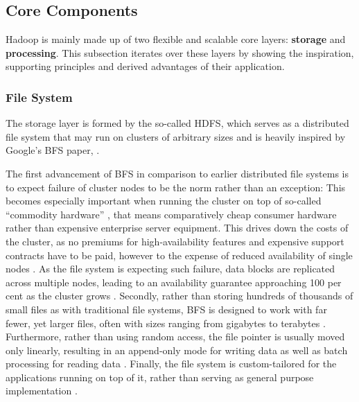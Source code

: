 \subsection{Core Components}
\label{hadoop-components}
\label{sota-hadoop-components}

Hadoop is mainly made up of two flexible and scalable core layers: \textbf{storage} and \textbf{processing}. This subsection iterates over these layers by showing the inspiration, supporting principles and derived advantages of their application.

\subsubsection{File System}
The storage layer is formed by the so-called \acf{HDFS}, which serves as a distributed file system that may run on clusters of arbitrary sizes and is heavily inspired by Google's \ac{BFS} paper, \textcite{ghemawat2003gfs}.

The first advancement of \ac{BFS} in comparison to earlier distributed file systems is to expect failure of cluster nodes to be the norm rather than an exception: This becomes especially important when running the cluster on top of so-called \enquote{commodity hardware} \autocite[p.~1]{ghemawat2003gfs}, that means comparatively cheap consumer hardware rather than expensive enterprise server equipment. This drives down the costs of the cluster, as no premiums for high-availability features and expensive support contracts have to be paid, however to the expense of reduced availability of single nodes \autocite[p.~1]{ghemawat2003gfs}. As the file system is expecting such failure, data blocks are replicated across multiple nodes, leading to an availability guarantee approaching 100 per cent as the cluster grows \autocite[p.~2]{ghemawat2003gfs}. Secondly, rather than storing hundreds of thousands of small files as with traditional file systems, \ac{BFS} is designed to work with far fewer, yet larger files, often with sizes ranging from gigabytes to terabytes \autocite[p.~2]{ghemawat2003gfs}. Furthermore, rather than using random access, the file pointer is usually moved only linearly, resulting in an append-only mode for writing data as well as batch processing for reading data \autocite[p.~2]{ghemawat2003gfs}. Finally, the file system is custom-tailored for the applications running on top of it, rather than serving as general purpose implementation \autocite[p.~2]{ghemawat2003gfs}.

